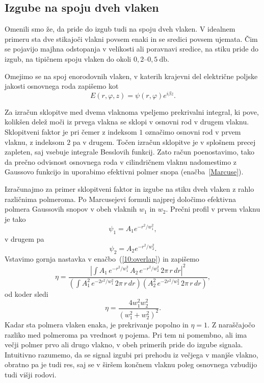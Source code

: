 \subsection*{Izgube na spoju dveh vlaken}
Omenili smo že, da pride do izgub tudi na spoju dveh vlaken. 
V idealnem primeru sta dve stikajoči vlakni povsem enaki in se sredici povsem ujemata. 
Čim se pojavijo majhna odstopanja v velikosti ali poravnavi sredice, na stiku pride 
do izgub, na tipičnem spoju vlaken do okoli $0,2$--$0,5~\si{\decibel}$.

Omejimo se na spoj enorodovnih vlaken, v katerih krajevni del 
električne poljske jakosti osnovnega roda zapišemo kot
\begin{equation}
E(r, \varphi, z)=\psi(r, \varphi) e^{i\beta z}.
\end{equation} 

Za izračun sklopitve med dvema vlaknoma vpeljemo prekrivalni integral,
ki pove, kolikšen delež moči iz prvega vlakna 
se sklopi v osnovni rod v drugem vlaknu. Sklopitveni faktor je
pri čemer z indeksom $1$ označimo osnovni rod v prvem vlaknu, z indeksom $2$ pa 
v drugem. Točen izračun sklopitve je v splošnem precej zapleten, saj vsebuje integrale
Besslovih funkcij. Zato račun poenostavimo, tako 
da prečno odvisnost osnovnega roda v cilindričnem vlaknu nadomestimo z 
Gaussovo funkcijo in uporabimo efektivni polmer snopa (enačba~\ref{Marcuse}).

Izračunajmo za primer sklopitveni faktor in izgube na stiku dveh vlaken z rahlo 
različnima polmeroma. Po Marcusejevi formuli najprej določimo efektivna polmera Gaussovih snopov
v obeh vlaknih $w_1$ in $w_2$. Prečni profil v prvem vlaknu je tako
\begin{equation}
\psi_1 = A_1 e^{-r^2/w_1^2},
\end{equation}
v drugem pa 
\begin{equation}
\psi_2 = A_2 e^{-r^2/w_2^2}.
\end{equation}
Vstavimo gornja nastavka v enačbo~(\ref{10:overlap}) in zapišemo
\begin{equation}
\eta = \frac{|\int A_1 \, e^{-r^2/w_1^2}\, A_2\, e^{-r^2/w_2^2}\, 2 \pi\, r\, dr|^2}
{\left(\int A_1^2 \,e^{-2r^2/w_1^2} \, 2 \pi \, r\, dr \right) \left( A_2^2\, 
e^{-2r^2/w_2^2}\, 2 \pi \, r\, dr \right)},
\end{equation}
od koder sledi
\begin{equation}
\eta = \frac{4 w_1^2 w_2^2}{(w_1^2+w_2^2)^2}.
\end{equation}
Kadar sta polmera vlaken enaka, je prekrivanje popolno in $\eta = 1$. Z naraščajočo razliko
med polmeroma pa vrednost $\eta$ pojema. Pri tem
ni pomembno, ali ima večji polmer prvo ali drugo vlakno, v obeh primerih pride do izgube 
signala. Intuitivno razumemo, da se signal izgubi pri prehodu iz večjega v manjše vlakno, 
obratno pa je tudi res, saj se v širšem končnem vlaknu poleg osnovnega vzbudijo
tudi višji rodovi. 

